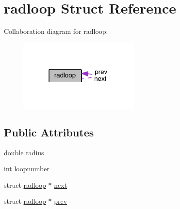 \hypertarget{structradloop}{\section{radloop Struct Reference}
\label{structradloop}
}


Collaboration diagram for radloop\+:
\nopagebreak
\begin{figure}[H]
\begin{center}
\leavevmode
\includegraphics[width=171pt]{structradloop__coll__graph}
\end{center}
\end{figure}
\subsection*{Public Attributes}
\begin{DoxyCompactItemize}
\item 
double \hyperlink{structradloop_ae48cb0dfffdc71d27f415e7cfa5c6686}{radius}
\item 
int \hyperlink{structradloop_adefa8966693107c10ddee0d908eba5b0}{loopnumber}
\item 
struct \hyperlink{structradloop}{radloop} $\ast$ \hyperlink{structradloop_a07f6e1a0e19e5a7e03a9e831e8300d37}{next}
\item 
struct \hyperlink{structradloop}{radloop} $\ast$ \hyperlink{structradloop_acdcfc14a34e3316c6ecc01efcf5a8e46}{prev}
\end{DoxyCompactItemize}


